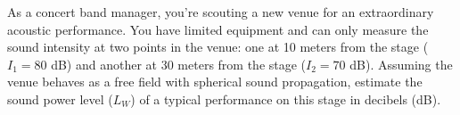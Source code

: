 \documentclass[border=10pt]{standalone}
\begin{document}
\begin{tcolorbox}[
    enhanced,
    colback=blue!5,
    colframe=questioncolor,
    boxrule=1pt,
    arc=5mm,
    outer arc=1mm,
    drop fuzzy shadow=questioncolor,
]
\begin{minipage}{0.95\linewidth}
\color{questioncolor}\sffamily\large
As a concert band manager, you're scouting a new venue for an extraordinary acoustic performance. You have limited equipment and can only measure the sound intensity at two points in the venue: one at 10 meters from the stage ($I_1 = 80$ dB) and another at 30 meters from the stage ($I_2 = 70$ dB). Assuming the venue behaves as a free field with spherical sound propagation, estimate the sound power level ($L_W$) of a typical performance on this stage in decibels (dB).
\end{minipage}
\end{tcolorbox}
\end{document}
